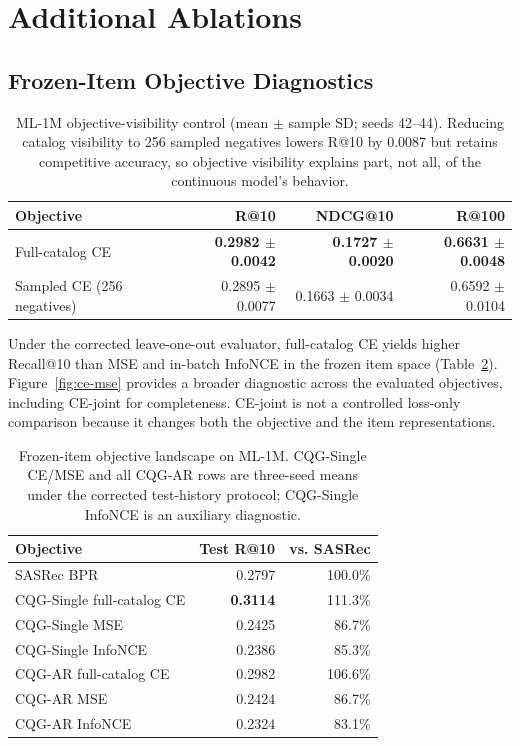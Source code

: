 \documentclass[letterpaper]{article}
\begin{document}
\section{Additional Ablations}
\label{app:ablations}

\subsection{Frozen-Item Objective Diagnostics}
\label{app:loss-objectives}

\begin{table}[H]
\centering
\small
\begin{tabular}{lrrr}
\toprule
Objective & R@10 & NDCG@10 & R@100 \\
\midrule
Full-catalog CE & \textbf{0.2982 \(\pm\) 0.0042} & \textbf{0.1727 \(\pm\) 0.0020} & \textbf{0.6631 \(\pm\) 0.0048} \\
Sampled CE (256 negatives) & 0.2895 \(\pm\) 0.0077 & 0.1663 \(\pm\) 0.0034 & 0.6592 \(\pm\) 0.0104 \\
\bottomrule
\end{tabular}
\caption{ML-1M objective-visibility control (mean $\pm$ sample SD; seeds 42--44). Reducing catalog visibility to 256 sampled negatives lowers R@10 by 0.0087 but retains competitive accuracy, so objective visibility explains part, not all, of the continuous model's behavior.}
\label{tab:objective-control}
\end{table}

Under the corrected leave-one-out evaluator, full-catalog CE yields higher
Recall@10 than MSE and in-batch InfoNCE in the frozen item space
(Table~\ref{tab:loss}). Figure~\ref{fig:ce-mse} provides a broader diagnostic
across the evaluated objectives, including CE-joint for completeness. CE-joint is
not a controlled loss-only comparison because it changes both the objective
and the item representations.

\begin{table}[H]
\centering
\small
\begin{tabular}{lrr}
\toprule
Objective & Test R@10 & vs. SASRec \\
\midrule
SASRec BPR & 0.2797 & 100.0\% \\
CQG-Single full-catalog CE & \textbf{0.3114} & 111.3\% \\
CQG-Single MSE & 0.2425 & 86.7\% \\
CQG-Single InfoNCE & 0.2386 & 85.3\% \\
CQG-AR full-catalog CE & 0.2982 & 106.6\% \\
CQG-AR MSE & 0.2424 & 86.7\% \\
CQG-AR InfoNCE & 0.2324 & 83.1\% \\
\bottomrule
\end{tabular}
\caption{Frozen-item objective landscape on ML-1M. CQG-Single CE/MSE and all
CQG-AR rows are three-seed means under the corrected test-history protocol;
CQG-Single InfoNCE is an auxiliary diagnostic.}
\label{tab:loss}
\end{table}
\end{document}
